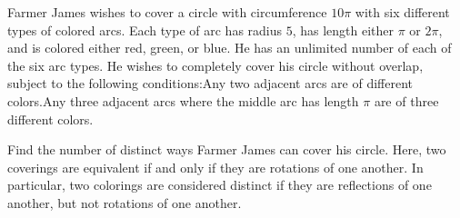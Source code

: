 Farmer James wishes to cover a circle with circumference $10\pi$ with six different types of colored arcs. Each type of arc has radius $5$,  has length either $\pi$ or $2\pi$,  and is colored either red, green, or blue. He has an unlimited number of each of the six arc types. He wishes to completely cover his circle without overlap, subject to the following conditions:Any two adjacent arcs are of different colors.Any three adjacent arcs where the middle arc has length $\pi$ are of three different colors.

Find the number of distinct ways Farmer James can cover his circle. Here, two coverings are equivalent if and only if they are rotations of one another. In particular, two colorings are considered distinct if they are reflections of one another, but not rotations of one another.